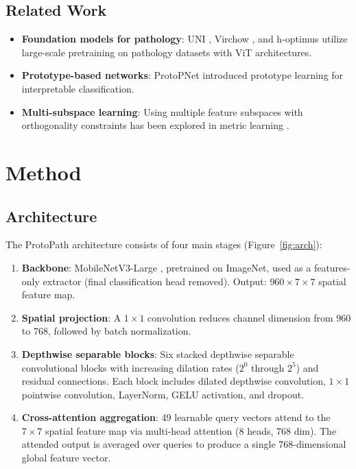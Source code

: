 \documentclass[11pt,twocolumn]{article}
\begin{document}
\subsection{Related Work}

\begin{itemize}[nosep]
    \item \textbf{Foundation models for pathology}: UNI \cite{chen2024uni}, Virchow \cite{vorontsov2024virchow}, and h-optimus \cite{hoptimus2024} utilize large-scale pretraining on pathology datasets with ViT architectures.
    \item \textbf{Prototype-based networks}: ProtoPNet \cite{chen2019looks} introduced prototype learning for interpretable classification.
    \item \textbf{Multi-subspace learning}: Using multiple feature subspaces with orthogonality constraints has been explored in metric learning \cite{oh2016deep}.
\end{itemize}

\section{Method}

\subsection{Architecture}

The ProtoPath architecture consists of four main stages (Figure~\ref{fig:arch}):

\begin{enumerate}[nosep]
    \item \textbf{Backbone}: MobileNetV3-Large \cite{howard2019searching}, pretrained on ImageNet, used as a features-only extractor (final classification head removed). Output: $960 \times 7 \times 7$ spatial feature map.
    \item \textbf{Spatial projection}: A $1\times1$ convolution reduces channel dimension from 960 to 768, followed by batch normalization.
    \item \textbf{Depthwise separable blocks}: Six stacked depthwise separable convolutional blocks with increasing dilation rates ($2^0$ through $2^5$) and residual connections. Each block includes dilated depthwise convolution, $1\times1$ pointwise convolution, LayerNorm, GELU activation, and dropout.
    \item \textbf{Cross-attention aggregation}: 49 learnable query vectors attend to the $7\times7$ spatial feature map via multi-head attention (8 heads, 768 dim). The attended output is averaged over queries to produce a single 768-dimensional global feature vector.
\end{enumerate}
\end{document}
